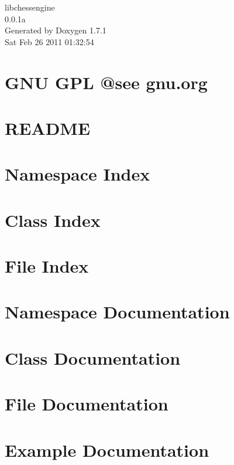 \documentclass[a4paper]{book}
\begin{document}
\hypersetup{pageanchor=false}
\begin{titlepage}
\vspace*{7cm}
\begin{center}
{\Large libchessengine \\[1ex]\large 0.0.1a }\\
\vspace*{1cm}
{\large Generated by Doxygen 1.7.1}\\
\vspace*{0.5cm}
{\small Sat Feb 26 2011 01:32:54}\\
\end{center}
\end{titlepage}
\clearemptydoublepage
{}
\tableofcontents
\clearemptydoublepage
{}
\hypersetup{pageanchor=true}
\chapter{GNU GPL @see gnu.org}
\label{index}\hypertarget{index}{}
\chapter{README}
\label{README}
\hypertarget{README}{}

\chapter{Namespace Index}

\chapter{Class Index}

\chapter{File Index}

\chapter{Namespace Documentation}

\chapter{Class Documentation}




\chapter{File Documentation}


\chapter{Example Documentation}

\printindex
\end{document}
